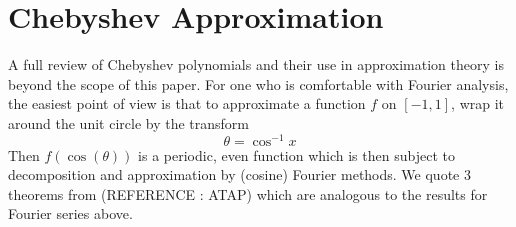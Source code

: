




\section{Chebyshev Approximation\label{Chebyshev}}
A full review of Chebyshev polynomials and their use in approximation theory is beyond the scope of this paper.  For one who is comfortable with Fourier analysis, the easiest point of view is that to approximate a function $f$ on $[-1,1]$, wrap it around the unit circle by the transform
\[ \theta = \cos^{-1} x \]
Then $f(\cos(\theta))$ is a periodic, even function which is then subject to decomposition and approximation by (cosine) Fourier methods.  We quote 3 theorems from (REFERENCE : ATAP) which are analogous to the results for Fourier series above.

